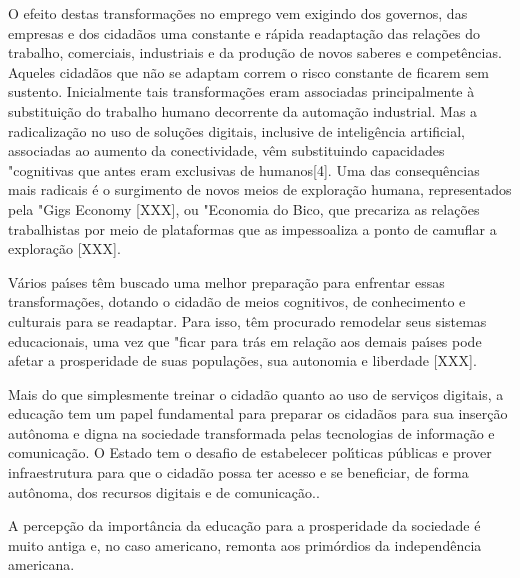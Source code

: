 \documentclass[
12pt,		%
openright,	%
twoside,  %
a4paper,			%
chapter=TITLE,		%
english,			%
french,				%
spanish,			%
brazil				%
]{USPSC-classe/USPSC}
\begin{document}
O efeito destas transforma\c{c}\~oes no emprego vem exigindo dos governos, das empresas e dos cidad\~aos uma constante e r\'apida readapta\c{c}\~ao  das rela\c{c}\~oes do trabalho, comerciais, industriais e da produ\c{c}\~ao de novos saberes e compet\^encias. Aqueles cidad\~aos que n\~ao se adaptam correm o risco constante de ficarem sem sustento. Inicialmente tais transforma\c{c}\~oes eram associadas principalmente \`a substitui\c{c}\~ao do trabalho humano decorrente da automa\c{c}\~ao industrial. Mas a radicaliza\c{c}\~ao no uso de solu\c{c}\~oes digitais, inclusive de intelig\^encia artificial, associadas ao aumento da conectividade, v\^em substituindo capacidades "cognitivas que antes eram exclusivas de humanos[4]. Uma das consequ\^encias mais radicais \'e o surgimento de novos meios de explora\c{c}\~ao humana, representados pela "Gigs Economy [XXX], ou "Economia do Bico, que precariza as rela\c{c}\~oes trabalhistas por meio de plataformas que as impessoaliza a ponto de camuflar a explora\c{c}\~ao [XXX].




V\'arios pa\'{\i}ses t\^em buscado uma melhor prepara\c{c}\~ao para enfrentar essas transforma\c{c}\~oes, dotando o cidad\~ao de meios cognitivos, de conhecimento e culturais para se readaptar. Para isso, t\^em procurado remodelar seus sistemas educacionais, uma vez que "ficar para tr\'as em rela\c{c}\~ao aos demais pa\'{\i}ses pode afetar a prosperidade de suas popula\c{c}\~oes, sua autonomia e liberdade [XXX]. 




Mais do que simplesmente treinar o cidad\~ao quanto ao uso  de servi\c{c}os digitais, a educa\c{c}\~ao tem um papel fundamental para preparar os cidad\~aos para sua inser\c{c}\~ao aut\^onoma e digna na sociedade transformada pelas tecnologias de informa\c{c}\~ao e comunica\c{c}\~ao. O Estado tem o desafio de estabelecer pol\'{\i}ticas p\'ublicas e prover infraestrutura para que o cidad\~ao possa ter acesso e se beneficiar, de forma aut\^onoma, dos recursos digitais e de comunica\c{c}\~ao..




A percep\c{c}\~ao da import\^ancia da educa\c{c}\~ao para a prosperidade da sociedade \'e muito antiga e, no caso americano, remonta aos prim\'ordios da independ\^encia americana. 
\end{document}
